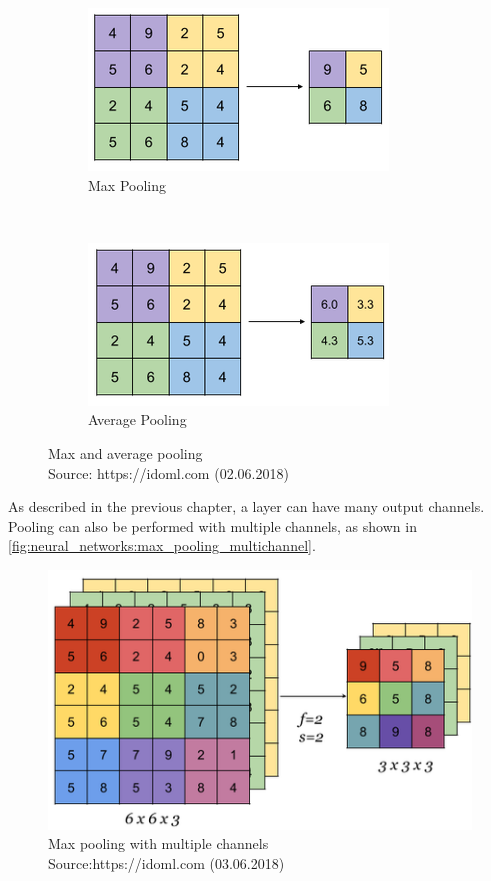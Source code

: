 \begin{figure}[H]
    \centering
	\begin{subfigure}{0.4\textwidth}
    	\includegraphics[width=0.9\linewidth]{chapters/neural_networks/images/max_pooling.png}		    \caption{Max Pooling}
    	\label{fig:neural_networks:max_pooling}
	\end{subfigure}~
	\begin{subfigure}{0.4\textwidth}
    	\includegraphics[width=0.9\linewidth]{chapters/neural_networks/images/avg_pooling.png}       	\caption{Average Pooling}
    	\label{fig:neural_networks:avg_pooling}
	\end{subfigure}
	\caption{Max and average pooling\\Source: https://idoml.com (02.06.2018)}
	\label{fig:neural_networks:pooling}
\end{figure}

As described in the previous chapter, a layer can have many output channels. Pooling can also be performed with multiple channels, as shown in \autoref{fig:neural_networks:max_pooling_multichannel}.

\begin{figure}[H]
    \centering
	\includegraphics[width=0.6\linewidth]{chapters/neural_networks/images/max_pooling_multichannel.png}
	\caption{Max pooling with multiple channels\\ Source:https://idoml.com (03.06.2018)}
	\label{fig:neural_networks:max_pooling_multichannel}
\end{figure}

